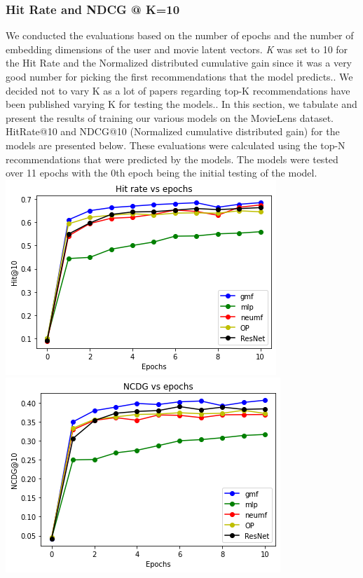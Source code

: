 \documentclass{article}
\begin{document}
\subsubsection{Hit Rate and NDCG @ K=10}
We conducted the evaluations based on the number of epochs and the number of embedding dimensions of the user and movie latent vectors. \emph{K} was set to 10 for the Hit Rate and the Normalized distributed cumulative gain since it was a very good number for picking the first recommendations that the model predicts.. We decided not to vary K as a lot of papers regarding top-K recommendations have been published varying K for testing the models.. 
In this section, we tabulate and present the results of training our various models on the MovieLens dataset. \\
HitRate@10 and NDCG@10 (Normalized cumulative distributed gain) for the models are presented below. These evaluations were calculated using the top-N recommendations that were predicted by the models. The models were tested over 11 epochs with the 0th epoch being the initial testing of the model.\\
\includegraphics[scale=0.5]{hit_rate}
\includegraphics[scale=0.5]{ncdg}\\
\end{document}
